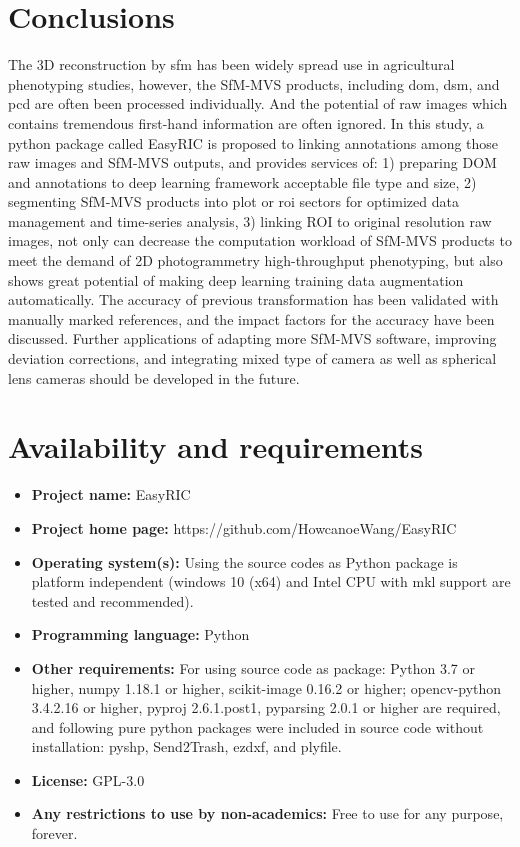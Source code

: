 \documentclass{configs/bmcart}
\begin{document}
\section*{Conclusions}
The 3D reconstruction by \acrfull*{sfm} has been widely spread use in agricultural phenotyping studies, however, the SfM-MVS products, including \acrfull*{dom}, \acrfull*{dsm}, and \acrfull*{pcd} are often been processed individually. And the potential of raw images which contains tremendous first-hand information are often ignored. In this study, a python package called EasyRIC is proposed to linking annotations among those raw images and SfM-MVS outputs, and provides services of: 1) preparing DOM and annotations to deep learning framework acceptable file type and size, 2) segmenting SfM-MVS products into plot or \acrfull*{roi} sectors for optimized data management and time-series analysis, 3) linking ROI to original resolution raw images, not only can decrease the computation workload of SfM-MVS products to meet the demand of 2D photogrammetry high-throughput phenotyping, but also shows great potential of making deep learning training data augmentation automatically. The accuracy of previous transformation has been validated with manually marked references, and the impact factors for the accuracy have been discussed. Further applications of adapting more SfM-MVS software, improving deviation corrections, and integrating mixed type of camera as well as spherical lens cameras should be developed in the future.

\section*{Availability and requirements}
\begin{itemize}
  \item \textbf{Project name:} EasyRIC
  \item \textbf{Project home page:} https://github.com/HowcanoeWang/EasyRIC
  \item \textbf{Operating system(s):} Using the source codes as Python package is platform independent (windows 10 (x64) and Intel CPU with \acrfull*{mkl} support are tested and recommended).
  \item \textbf{Programming language: } Python
  \item \textbf{Other requirements:} For using source code as package: Python 3.7 or higher, numpy 1.18.1 or higher, scikit-image 0.16.2 or higher; opencv-python 3.4.2.16 or higher, pyproj 2.6.1.post1, pyparsing 2.0.1 or higher are required, and following pure python packages were included in source code without installation: pyshp, Send2Trash, ezdxf, and plyfile.
  \item \textbf{License:} GPL-3.0
  \item \textbf{Any restrictions to use by non-academics:} Free to use for any purpose, forever.
\end{itemize}
\end{document}

